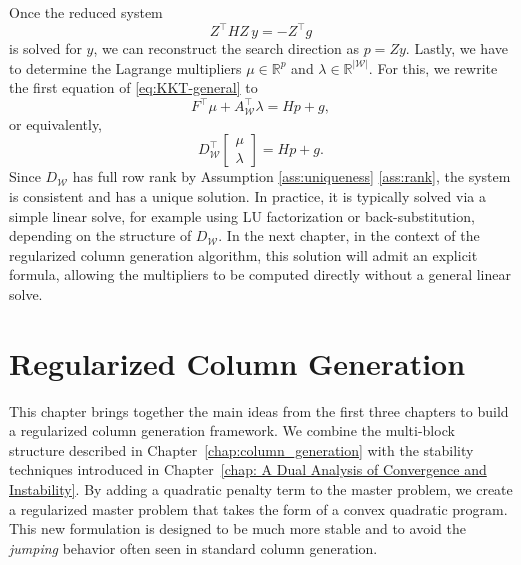 \documentclass{book}
\theoremstyle{definition}
\newcounter{algorithm_}
\numberwithin{algorithm_}{chapter}
\begin{document}
Once the reduced system 
\begin{equation}
Z^\top H Z \, y = - Z^\top g
\end{equation}
is solved for $y$, we can reconstruct the search direction as $p = Z y$. Lastly, we have to determine the Lagrange multipliers $\mu \in \mathbb{R}^p$ and $\lambda \in \mathbb{R}^{|\mathcal{W}|}$. For this, we rewrite the first equation of \eqref{eq:KKT-general} to
\begin{equation}
F^\top \mu + A_{\mathcal{W}}^\top \lambda = H p + g,
\end{equation}
or equivalently,
\begin{equation}
D_{\mathcal{W}}^\top 
\begin{bmatrix} \mu \\ \lambda \end{bmatrix} 
= H p + g.
\end{equation}
Since $D_{\mathcal{W}}$ has full row rank by Assumption \ref{ass:uniqueness} \ref{ass:rank}, the system is consistent and has a unique solution. In practice, it is typically solved via a simple linear solve, for example using LU factorization or back-substitution, depending on the structure of $D_{\mathcal{W}}$. In the next chapter, in the context of the regularized column generation algorithm, this solution will admit an explicit formula, allowing the multipliers to be computed directly without a general linear solve.













\chapter{Regularized Column Generation}
\label{chap:regularized column generation}


\vspace*{\fill}

This chapter brings together the main ideas from the first three chapters to build a regularized column generation framework.
We combine the multi-block structure described in Chapter~\ref{chap:column_generation} with the stability techniques introduced in Chapter~\ref{chap: A Dual Analysis of Convergence and Instability}. By adding a quadratic penalty term to the master problem, we create a regularized master problem that takes the form of a convex quadratic program. This new formulation is designed to be much more stable and to avoid the \textit{jumping} behavior often seen in standard column generation.
\end{document}

